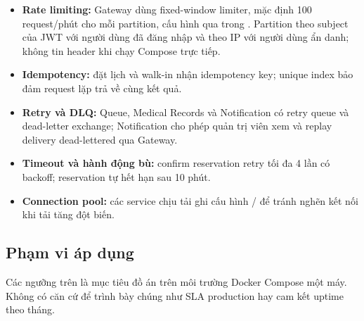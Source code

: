 \begin{itemize}
  \item \textbf{Rate limiting:} Gateway dùng fixed-window limiter, mặc định 100 request/phút cho mỗi partition, cấu hình qua  trong . Partition theo subject của JWT với người dùng đã đăng nhập và theo IP với người dùng ẩn danh; không tin header  khi chạy Compose trực tiếp.
  \item \textbf{Idempotency:} đặt lịch và walk-in nhận idempotency key; unique index bảo đảm request lặp trả về cùng kết quả.
  \item \textbf{Retry và DLQ:} Queue, Medical Records và Notification có retry queue và dead-letter exchange; Notification cho phép quản trị viên xem và replay delivery dead-lettered qua Gateway.
  \item \textbf{Timeout và hành động bù:} confirm reservation retry tối đa 4 lần có backoff; reservation tự hết hạn sau 10 phút.
  \item \textbf{Connection pool:} các service chịu tải ghi cấu hình / để tránh nghẽn kết nối khi tải tăng đột biến.
\end{itemize}

\subsection{Phạm vi áp dụng}

Các ngưỡng trên là mục tiêu đồ án trên môi trường Docker Compose một máy. Không có căn cứ để trình bày chúng như SLA production hay cam kết uptime theo tháng.
